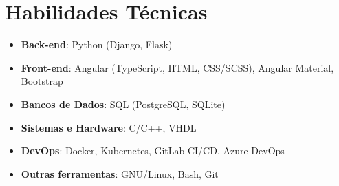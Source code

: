 \documentclass[a4paper,10pt]{article}
\begin{document}
\section*{Habilidades Técnicas}\vspace{0.6em}

\begin{itemize}
    \setlength\itemsep{0em}
    \item \textbf{Back-end}: Python (Django, Flask)
    \item \textbf{Front-end}: Angular (TypeScript, HTML, CSS/SCSS), Angular Material, Bootstrap
    \item \textbf{Bancos de Dados}: SQL (PostgreSQL, SQLite)
    \item \textbf{Sistemas e Hardware}: C/C++, VHDL
    \item \textbf{DevOps}: Docker, Kubernetes, GitLab CI/CD, Azure DevOps
    \item \textbf{Outras ferramentas}: GNU/Linux, Bash, Git
\end{itemize}
\end{document}
